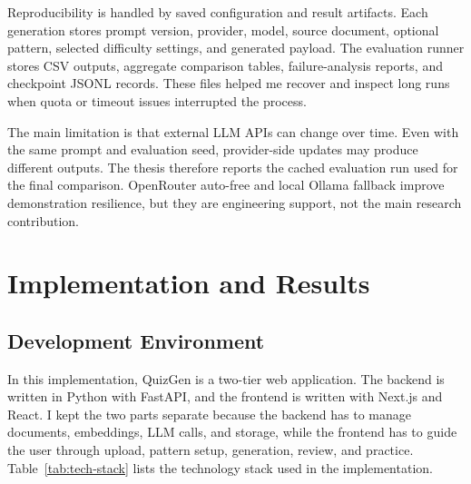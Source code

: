\documentclass[12pt,a4paper]{article}
\begin{document}
Reproducibility is handled by saved configuration and result artifacts. Each
generation stores prompt version, provider, model, source document, optional
pattern, selected difficulty settings, and generated payload. The evaluation
runner stores CSV outputs, aggregate comparison tables, failure-analysis
reports, and checkpoint JSONL records. These files helped me recover and
inspect long runs when quota or timeout issues interrupted the process.

The main limitation is that external LLM APIs can change over time. Even
with the same prompt and evaluation seed, provider-side updates may produce
different outputs. The thesis therefore reports the cached evaluation run
used for the final comparison. OpenRouter auto-free and local Ollama
fallback improve demonstration resilience, but they are engineering support,
not the main research contribution.

\clearpage
\section{Implementation and Results}

\subsection{Development Environment}

In this implementation, QuizGen is a two-tier web application. The backend
is written in Python with FastAPI, and the frontend is written with Next.js
and React. I kept the two parts separate because the backend has to manage
documents, embeddings, LLM calls, and storage, while the frontend has to
guide the user through upload, pattern setup, generation, review, and
practice. Table~\ref{tab:tech-stack} lists the technology stack used in the
implementation.
\end{document}
